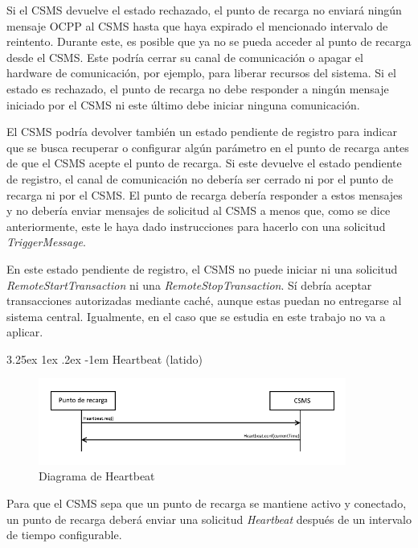 \documentclass[12pt,a4paper,onecolumn,oneside]{report}
\makeatletter
\renewcommand\paragraph{\@startsection{paragraph}{5}{\z@}%
  {3.25ex \@plus1ex \@minus.2ex}%
  {-1em}%
  {\normalfont\normalsize\bfseries}}
\makeatother
\begin{document}
Si el CSMS devuelve el estado rechazado, el punto de recarga no enviará ningún mensaje OCPP al CSMS hasta que haya expirado el mencionado intervalo de reintento. Durante este, es posible que ya no se pueda acceder al punto de recarga desde el CSMS. Este podría cerrar su canal de comunicación o apagar el hardware de comunicación, por ejemplo, para liberar recursos del sistema. Si el estado es rechazado, el punto de recarga no debe responder a ningún mensaje iniciado por el CSMS ni este último debe iniciar ninguna comunicación.

El CSMS podría devolver también un estado pendiente de registro para indicar que se busca recuperar o configurar algún parámetro en el punto de recarga antes de que el CSMS acepte el punto de recarga. Si este devuelve el estado pendiente de registro, el canal de comunicación no debería ser cerrado ni por el punto de recarga ni por el CSMS. El punto de recarga debería responder a estos mensajes y no debería enviar mensajes de solicitud al CSMS a menos que, como se dice anteriormente, este le haya dado instrucciones para hacerlo con una solicitud \textit{TriggerMessage}.

En este estado pendiente de registro, el CSMS no puede iniciar ni una solicitud \textit{RemoteStartTransaction} ni una \textit{RemoteStopTransaction}. Sí debría aceptar transacciones autorizadas mediante caché, aunque estas puedan no entregarse al sistema central. Igualmente, en el caso que se estudia en este trabajo no va a aplicar.

\paragraph{Heartbeat (latido)}
\label{Heartbeat (latido)}


\begin{figure}[H] 
\centering
  \includegraphics[width=0.9\textwidth]{figuras/diagramaheartbeat.png}
  \caption[Diagrama de \textit{Heartbeat}]{Diagrama de Heartbeat\\
  }
  \label{fig:diagramaheartbeat}
\end{figure}


Para que el CSMS sepa que un punto de recarga se mantiene activo y conectado, un punto de recarga deberá enviar una solicitud \textit{Heartbeat} después de un intervalo de tiempo configurable.
\end{document}
